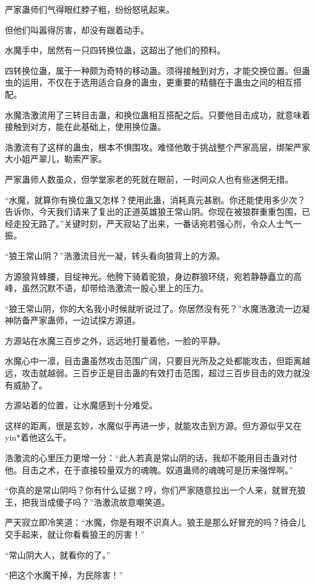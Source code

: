 \begin{this_body}
严家蛊师们气得眼红脖子粗，纷纷怒吼起来。

但他们叫嚣得厉害，却没有跟着动手。

水魔手中，居然有一只四转换位蛊，这超出了他们的预料。

四转换位蛊，属于一种颇为奇特的移动蛊。须得接触到对方，才能交换位置。但蛊虫的运用，不仅在于选用适合自身的蛊虫，更重要的精髓在于蛊虫之间的相互搭配。

水魔浩激流用了三转目击蛊，和换位蛊相互搭配之后。只要他目击成功，就意味着接触到对方，能在此基础上，使用换位蛊。

浩激流有了这样的蛊虫，根本不惧围攻。难怪他敢于挑战整个严家高层，绑架严家大小姐严翠儿，勒索严家。

严家蛊师人数虽众，但学堂家老的死就在眼前，一时间众人也有些迷惘无措。

“水魔，就算你有换位蛊又怎样？使用此蛊，消耗真元甚剧。你还能使用多少次？告诉你，今天我们请来了复出的正道英雄狼王常山阴。你现在被狼群重重包围，已经走投无路了。”关键时刻，严天寂站了出来，一番话宛若强心剂，令众人士气一振。

“狼王常山阴？”浩激流目光一凝，转头看向狼背上的方源。

方源狼背蜂腰，目绽神光。他胯下骑着驼狼，身边群狼环绕，宛若静静矗立的高峰，虽然沉默不语，却带给浩激流一股心里上的压力。

“狼王常山阴，你的大名我小时候就听说过了。你居然没有死？”水魔浩激流一边凝神防备严家蛊师，一边试探方源道。

方源站在水魔三百步之外，远远地打量着他，一脸的平静。

水魔心中一凛，目击蛊虽然攻击范围广阔，只要目光所及之处都能攻击，但距离越远，攻击就越弱。三百步正是目击蛊的有效打击范围，超过三百步目击的效力就没有威胁了。

方源站着的位置，让水魔感到十分难受。

这样的距离，很是玄妙，水魔似乎再进一步，就能攻击到方源。但方源似乎又在yin*着他这么干。

浩激流的心里压力更增一分：“此人若真是常山阴的话，我却不能用目击蛊对付他。目击之术，在于直接较量双方的魂魄。奴道蛊师的魂魄可是历来强悍啊。”

“你真的是常山阴吗？你有什么证据？哼，你们严家随意拉出一个人来，就冒充狼王，把我当成傻子吗？”浩激流故意嘲笑道。

严天寂立即冷笑道：“水魔，你是有眼不识真人。狼王是那么好冒充的吗？待会儿交手起来，就让你看看狼王的厉害！”

“常山阴大人，就看你的了。”

“把这个水魔干掉，为民除害！”


\end{this_body}
